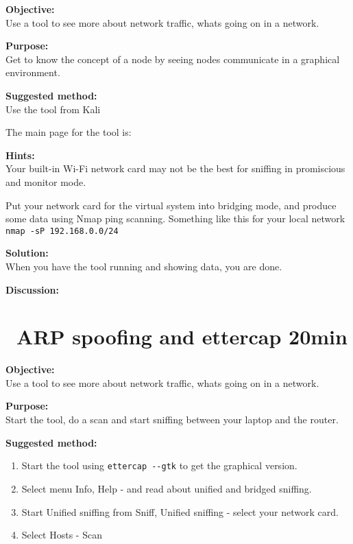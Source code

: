 \documentclass[a4paper,11pt,notitlepage]{report}
\begin{document}
{\bf Objective:}\\
Use a tool to see more about network traffic, whats going on in a network.

{\bf Purpose:}\\
Get to know the concept of a node by seeing nodes communicate in a graphical environment.

{\bf Suggested method:}\\
Use the tool from Kali

The main page for the tool is:

{\bf Hints:}\\
Your built-in Wi-Fi network card may not be the best for sniffing in promiscious and monitor mode.

Put your network card for the virtual system into bridging mode, and produce some data using Nmap ping scanning. Something like this for your local network \verb+nmap -sP 192.168.0.0/24+

{\bf Solution:}\\
When you have the tool running and showing data, you are done.

{\bf Discussion:}\\


\chapter{\faInfoCircle\ ARP spoofing and ettercap 20min}
\label{ex:arp-spoof-ettercap}



{\bf Objective:}\\
Use a tool to see more about network traffic, whats going on in a network.

{\bf Purpose:}\\
Start the tool, do a scan and start sniffing between your laptop and the router.

{\bf Suggested method:}
\begin{enumerate}
\item Start the tool using \verb+ettercap --gtk+ to get the graphical version.
\item Select menu Info, Help - and read about unified and bridged sniffing.
\item Start Unified sniffing from Sniff, Unified sniffing - select your network card.
\item Select Hosts - Scan
\end{enumerate}
\end{document}

